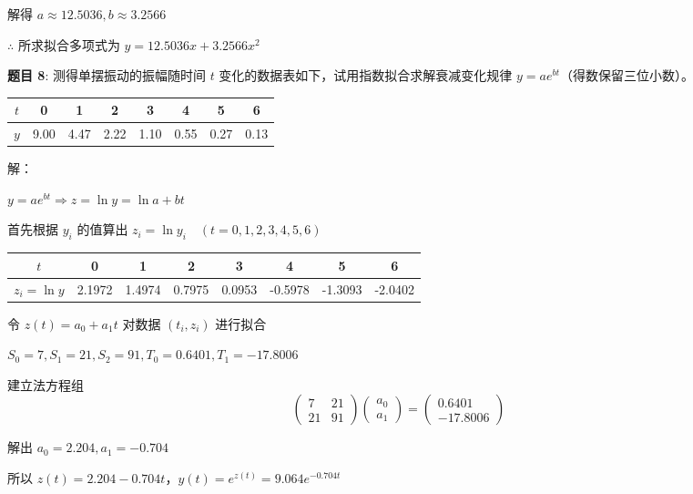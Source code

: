 \documentclass{article}
\begin{document}
解得 $a\approx 12.5036, b\approx 3.2566$

$\therefore$ 所求拟合多项式为 $y = 12.5036x + 3.2566x^2$

\noindent\textbf{题目 8}: 测得单摆振动的振幅随时间 $t$ 变化的数据表如下，试用指数拟合求解衰减变化规律 $y = ae^{bt}$（得数保留三位小数）。

\begin{center}
    \begin{tabular}{|c|c|c|c|c|c|c|c|}
        \hline
        $t$ & 0 & 1 & 2 & 3 & 4 & 5 & 6 \\
        \hline
        $y$ & 9.00 & 4.47 & 2.22 & 1.10 & 0.55 & 0.27 & 0.13 \\
        \hline
    \end{tabular}
\end{center}

\noindent 解：

$y = ae^{bt} \Longrightarrow z = \ln{y} = \ln{a} + bt$

首先根据 $y_i$ 的值算出 $z_i = \ln{y_i}\quad (t = 0, 1, 2, 3, 4, 5, 6)$

\begin{center}
    \begin{tabular}{|c|c|c|c|c|c|c|c|}
        \hline
        $t$ & 0 & 1 & 2 & 3 & 4 & 5 & 6 \\
        \hline
        $z_i = \ln{y}$ & 2.1972 & 1.4974 & 0.7975 & 0.0953 & -0.5978 & -1.3093 & -2.0402 \\
        \hline
    \end{tabular}
\end{center}

令 $z(t) = a_0 + a_1t$ 对数据 $(t_i, z_i)$ 进行拟合

$S_0 = 7, S_1 = 21, S_2 = 91, T_0 = 0.6401, T_1 = -17.8006$

建立法方程组
$$
\begin{pmatrix}
    7 & 21 \\
    21 & 91
\end{pmatrix}
\begin{pmatrix}
    a_0 \\
    a_1
\end{pmatrix}
=
\begin{pmatrix}
    0.6401 \\
    -17.8006
\end{pmatrix}
$$

解出 $a_0 = 2.204, a_1 = -0.704$

所以 $z(t) = 2.204 - 0.704t$，$y(t) = e^{z(t)} = 9.064e^{-0.704t}$
\end{document}
